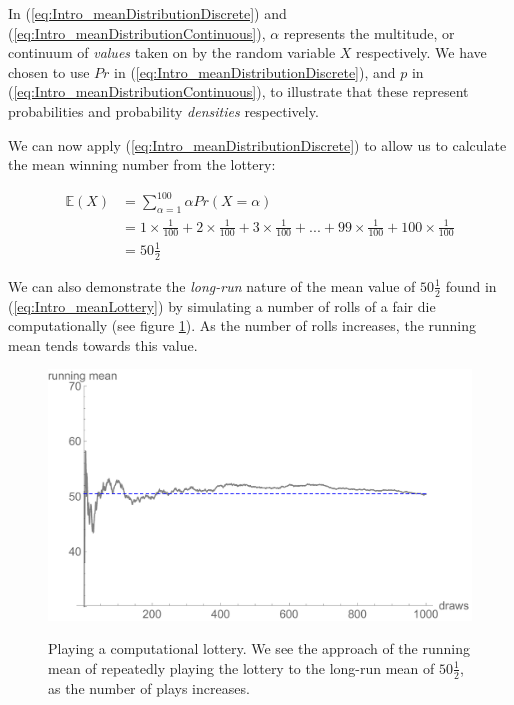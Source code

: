 \documentclass[11pt,fullpage]{book}
\begin{document}
In (\ref{eq:Intro_meanDistributionDiscrete}) and (\ref{eq:Intro_meanDistributionContinuous}), $\alpha$ represents the multitude, or continuum of \textit{values} taken on by the random variable $X$ respectively.  We have chosen to use $Pr$ in (\ref{eq:Intro_meanDistributionDiscrete}), and $p$ in (\ref{eq:Intro_meanDistributionContinuous}), to illustrate that these represent probabilities and probability \textit{densities} respectively.

We can now apply (\ref{eq:Intro_meanDistributionDiscrete}) to allow us to calculate the mean winning number from the lottery:

\begin{equation}\label{eq:Intro_meanLottery}
\begin{align}
\mathbb{E}(X) &= \sum\limits_{\alpha=1}^{100} \alpha Pr(X=\alpha)\\
&= 1\times\frac{1}{100} +  2\times\frac{1}{100} +  3\times\frac{1}{100} + ... +  99\times\frac{1}{100} +  100\times\frac{1}{100}\\
&= 50\tfrac{1}{2}
\end{align}
\end{equation}

We can also demonstrate the \textit{long-run} nature of the mean value of $50\tfrac{1}{2}$ found in (\ref{eq:Intro_meanLottery}) by simulating a number of rolls of a fair die computationally (see figure \ref{fig:Intro_meanDiscreteLongRun}). As the number of rolls increases, the running mean tends towards this value.

\begin{figure}
\centering
\scalebox{0.55} 
{\includegraphics{Intro_meanDiscreteLongRun.pdf}}
\caption{Playing a computational lottery. We see the approach of the running mean of repeatedly playing the lottery to the long-run mean of $50\tfrac{1}{2}$, as the number of plays increases.}\label{fig:Intro_meanDiscreteLongRun}
\end{figure}
\end{document}
